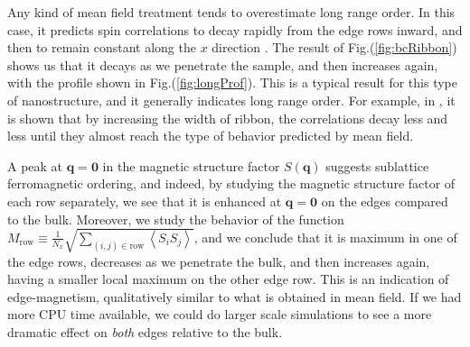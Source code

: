 Any kind of mean field treatment tends to overestimate long range order.
In this case, it predicts spin correlations to decay rapidly from the edge rows inward, and then to remain constant along the $x$ direction \cite{feldner_dynamical_2011}.
The result of Fig.(\ref{fig:bcRibbon}) shows us that it decays as we penetrate the sample, and then increases again, with the profile shown in Fig.(\ref{fig:longProf}).
This is a typical result for this type of nanostructure, and it generally indicates long range order.
For example, in \cite{feldner_dynamical_2011}, it is shown that by increasing the width of ribbon, the correlations decay less and less until they almost reach the type of behavior predicted by mean field.

A peak at $\bm q = \bm 0$ in the magnetic structure factor $S ( \bm q )$ suggests sublattice ferromagnetic ordering, and indeed, by studying the magnetic structure factor of each row separately, we see that it is enhanced at $\bm q = \bm 0$ on the edges compared to the bulk.
Moreover, we study the behavior of the function $M_{\text{row}} \equiv \frac{1}{N_x}\sqrt{ \sum_{(i, j) \in \text{row}} \left\langle S_i S_j \right\rangle}$, and we conclude that it is maximum in one of the edge rows, decreases as we penetrate the bulk, and then increases again, having a smaller local maximum on the other edge row.
This is an indication of edge-magnetism, qualitatively similar to what is obtained in mean field.
If we had more CPU time available, we could do larger scale simulations to see a more dramatic effect on \emph{both} edges relative to the bulk.

